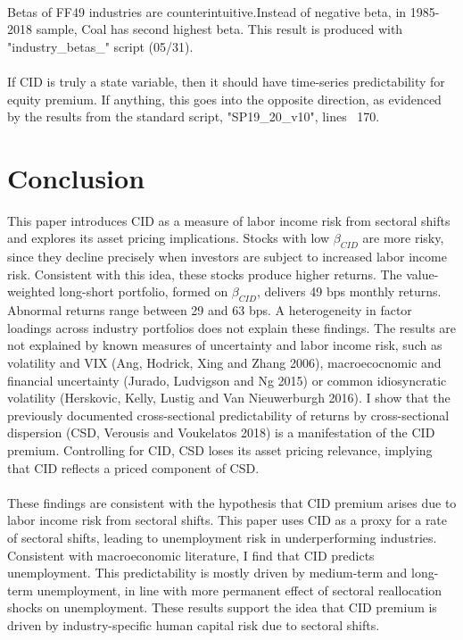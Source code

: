 \documentclass[12pt]{article}
\begin{document}
\paragraph{}
Betas of FF49 industries are counterintuitive.Instead of negative beta, in 1985-2018 sample, Coal has second highest beta. This result is produced with "industry_betas_" script (05/31).
\paragraph{}
If CID is truly a state variable, then it should have time-series predictability for equity premium. If anything, this goes into the opposite direction, as evidenced by the results from the standard script, "SP19_20_v10", lines ~170.


\vspace{1cm}

\section{Conclusion} \label{sec:Model}

This paper introduces CID as a measure of labor income risk from sectoral shifts and explores its asset pricing implications. Stocks with low $\beta_{CID}$ are more risky, since they decline precisely when investors are subject to increased labor income risk. Consistent with this idea, these stocks produce higher returns. The value-weighted long-short portfolio, formed on $\beta_{CID}$, delivers 49 bps monthly returns. Abnormal returns range between 29 and 63 bps. A heterogeneity in factor loadings across industry portfolios does not explain these findings. The results are not explained by known measures of uncertainty and labor income risk, such as volatility and VIX (Ang, Hodrick, Xing and Zhang 2006), macroecocnomic and financial uncertainty (Jurado, Ludvigson and Ng 2015) or common idiosyncratic volatility (Herskovic, Kelly, Lustig and Van Nieuwerburgh 2016). I show that the previously documented cross-sectional predictability of returns by cross-sectional dispersion (CSD, Verousis and Voukelatos 2018) is a manifestation of the CID premium. Controlling for CID, CSD loses its asset pricing relevance, implying that CID reflects a priced component of CSD.
\paragraph{}
These findings are consistent with the hypothesis that CID premium arises due to labor income risk from sectoral shifts. This paper uses CID as a proxy for a rate of sectoral shifts, leading to unemployment risk in underperforming industries. Consistent with macroeconomic literature, I find that CID predicts unemployment. This predictability is mostly driven by medium-term and long-term unemployment, in line with more permanent effect of sectoral reallocation shocks on unemployment. These results support the idea that CID premium is driven by industry-specific human capital risk due to sectoral shifts.
\end{document}
